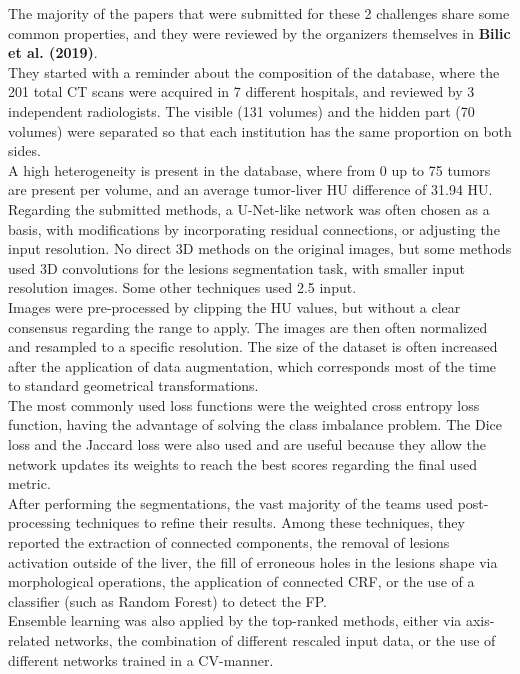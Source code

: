 The majority of the papers that were submitted for these 2 challenges
share some common properties, and they were reviewed by the organizers
themselves in \textbf{Bilic et al. (2019)}.\\
They started with a reminder about the composition of the database,
where the 201 total CT scans were acquired in 7 different hospitals, and
reviewed by 3 independent radiologists. The visible (131 volumes) and
the hidden part (70 volumes) were separated so that each institution has
the same proportion on both sides.\\
A high heterogeneity is present in the database, where from 0 up to 75
tumors are present per volume, and an average tumor-liver HU difference
of 31.94 HU.\\
Regarding the submitted methods, a U-Net-like network was often chosen
as a basis, with modifications by incorporating residual connections, or
adjusting the input resolution. No direct 3D methods on the original
images, but some methods used 3D convolutions for the lesions
segmentation task, with smaller input resolution images. Some other
techniques used 2.5 input.\\
Images were pre-processed by clipping the HU values, but without a clear
consensus regarding the range to apply. The images are then often
normalized and resampled to a specific resolution. The size of the
dataset is often increased after the application of data augmentation,
which corresponds most of the time to standard geometrical
transformations.\\
The most commonly used loss functions were the weighted cross entropy
loss function, having the advantage of solving the class imbalance
problem. The Dice loss and the Jaccard loss were also used and are
useful because they allow the network updates its weights to reach the
best scores regarding the final used metric.\\
After performing the segmentations, the vast majority of the teams used
post-processing techniques to refine their results. Among these
techniques, they reported the extraction of connected components, the
removal of lesions activation outside of the liver, the fill of
erroneous holes in the lesions shape via morphological operations, the
application of connected CRF, or the use of a classifier (such as Random
Forest) to detect the FP.\\
Ensemble learning was also applied by the top-ranked methods, either via
axis-related networks, the combination of different rescaled input data,
or the use of different networks trained in a CV-manner.\\
